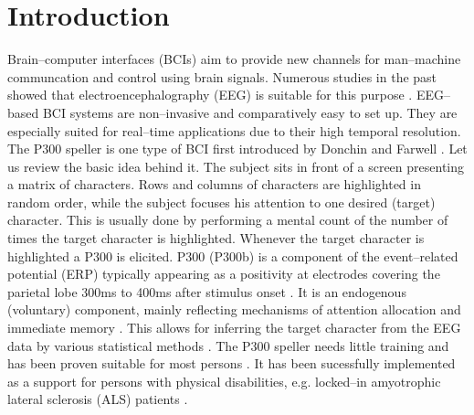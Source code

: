 \documentclass[a4paper,twocolumn]{article}
\begin{document}
\section*{Introduction}Brain--computer interfaces (BCIs) aim to provide new channels for man--machine communcation and control using brain signals. Numerous studies in the past showed that electroencephalography (EEG) is suitable for this purpose \cite{Vidal1977,Farwell1988,Wolpaw1991,Sutter1992,Pfurtscheller1993,Birbaumer1999}. EEG--based BCI systems are non--invasive and comparatively easy to set up. They are especially suited for real--time applications due to their high temporal resolution. The P300 speller is one type of BCI first introduced by Donchin and Farwell \cite{Farwell1988}. Let us review the basic idea behind it. The subject sits in front of a screen presenting a matrix of characters. Rows and columns of characters are highlighted in random order, while the subject focuses his attention to one desired (target) character. This is usually done by performing a mental count of the number of times the target character is highlighted. Whenever the target character is highlighted a P300 is elicited. P300 (P300b) is a component of the event--related potential (ERP) typically appearing as a positivity at electrodes covering the parietal lobe 300ms to 400ms after stimulus onset \cite{Sutton1965,PolichKok1995,PatelAzzam2005}. It is an endogenous (voluntary) component,  mainly reflecting mechanisms of attention allocation and immediate memory \cite{PolichKok1995, PatelAzzam2005}. This allows for inferring the target character from the EEG data by various statistical methods \cite{Krusienski2006,Bandt2009}. The P300 speller needs little training and has been proven suitable for most persons \cite{Guger2009}. It has been sucessfully implemented as a support for persons with physical disabilities, e.g. locked--in amyotrophic lateral sclerosis (ALS) patients \cite{Vaughan2006}. 
\end{document}
